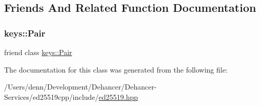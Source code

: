 \subsection{Friends And Related Function Documentation}
\mbox{\label{classed25519_1_1_signature_ad89670fe663c8c8526b69b1bc6a87c19}} 
\subsubsection{\texorpdfstring{keys::Pair}{keys::Pair}}
{\footnotesize\ttfamily friend class \mbox{\hyperlink{classed25519_1_1keys_1_1_pair}{keys\+::\+Pair}}\hspace{0.3cm}{\ttfamily [friend]}}



The documentation for this class was generated from the following file\+:\begin{DoxyCompactItemize}
\item 
/\+Users/denn/\+Development/\+Dehancer/\+Dehancer-\/\+Services/ed25519cpp/include/\mbox{\hyperlink{ed25519_8hpp}{ed25519.\+hpp}}\end{DoxyCompactItemize}
